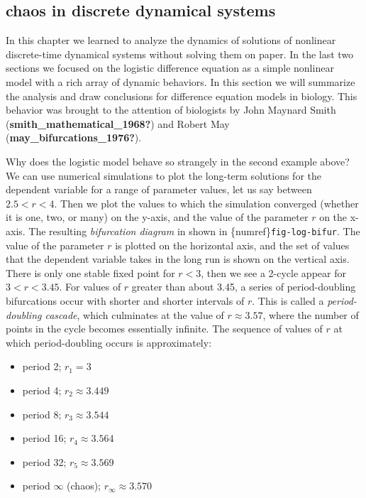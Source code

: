 \documentclass[
  letterpaper,
  DIV=11,
  numbers=noendperiod]{scrreprt}
\begin{document}
\hypertarget{chaos-in-discrete-dynamical-systems}{%
\subsection{chaos in discrete dynamical
systems}\label{chaos-in-discrete-dynamical-systems}}

In this chapter we learned to analyze the dynamics of solutions of
nonlinear discrete-time dynamical systems without solving them on paper.
In the last two sections we focused on the logistic difference equation
as a simple nonlinear model with a rich array of dynamic behaviors. In
this section we will summarize the analysis and draw conclusions for
difference equation models in biology. This behavior was brought to the
attention of biologists by John Maynard Smith
(\textbf{smith\_mathematical\_1968?}) and Robert May
(\textbf{may\_bifurcations\_1976?}).

Why does the logistic model behave so strangely in the second example
above? We can use numerical simulations to plot the long-term solutions
for the dependent variable for a range of parameter values, let us say
between \(2.5 < r < 4\). Then we plot the values to which the simulation
converged (whether it is one, two, or many) on the y-axis, and the value
of the parameter \(r\) on the x-axis. The resulting \emph{bifurcation
diagram} in shown in \{numref\}\texttt{fig-log-bifur}. The value of the
parameter \(r\) is plotted on the horizontal axis, and the set of values
that the dependent variable takes in the long run is shown on the
vertical axis. There is only one stable fixed point for \(r<3\), then we
see a 2-cycle appear for \(3<r<3.45\). For values of \(r\) greater than
about 3.45, a series of period-doubling bifurcations occur with shorter
and shorter intervals of \(r\). This is called a \emph{period-doubling
cascade}, which culminates at the value of \(r \approx 3.57\), where the
number of points in the cycle becomes essentially infinite. The sequence
of values of \(r\) at which period-doubling occurs is approximately:

\begin{itemize}
\item
  period 2; \(r_1 = 3\)
\item
  period 4; \(r_2 \approx 3.449\)
\item
  period 8; \(r_3 \approx 3.544\)
\item
  period 16; \(r_4 \approx 3.564\)
\item
  period 32; \(r_5 \approx 3.569\)
\item
  period \(\infty\) (chaos); \(r_\infty \approx 3.570\)
\end{itemize}
\end{document}
